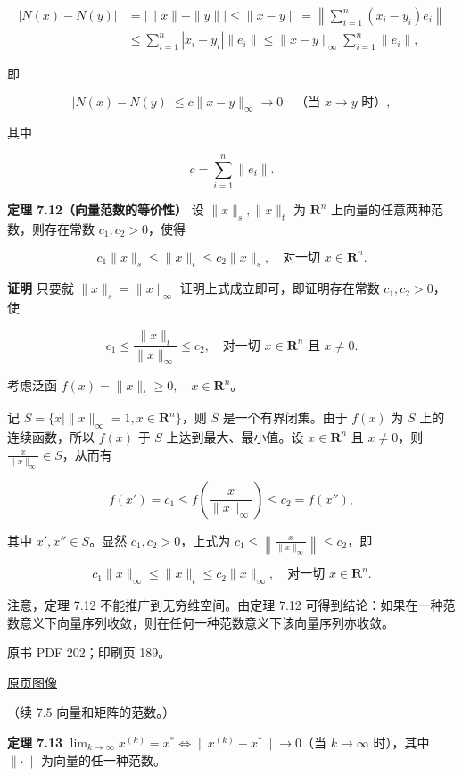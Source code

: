 \documentclass[
  10pt,
  fontset=fandol]{ctexart}
\begin{document}
\[
\begin{aligned}
|N(x)-N(y)|
&=\big|\|x\|-\|y\|\big|\leqslant\|x-y\|
=\left\|\sum_{i=1}^{n}(x_i-y_i)e_i\right\|\\
&\leqslant\sum_{i=1}^{n}|x_i-y_i|\|e_i\|
\leqslant\|x-y\|_\infty\sum_{i=1}^{n}\|e_i\|,
\end{aligned}
\]

即

\[
|N(x)-N(y)|\leqslant c\|x-y\|_\infty\to0\quad\text{（当 }x\to y\text{ 时）},
\]

其中

\[
c=\sum_{i=1}^{n}\|e_i\|.
\]

\textbf{定理 7.12（向量范数的等价性）} 设 \(\|x\|_s,\|x\|_t\) 为
\(\mathbf R^n\) 上向量的任意两种范数，则存在常数 \(c_1,c_2>0\)，使得

\[
c_1\|x\|_s\leqslant\|x\|_t\leqslant c_2\|x\|_s,\quad\text{对一切 }x\in\mathbf R^n.
\]

\textbf{证明} 只要就 \(\|x\|_s=\|x\|_\infty\)
证明上式成立即可，即证明存在常数 \(c_1,c_2>0\)，使

\[
c_1\leqslant\frac{\|x\|_t}{\|x\|_\infty}\leqslant c_2,\quad\text{对一切 }x\in\mathbf R^n\text{ 且 }x\neq0.
\]

考虑泛函 \(f(x)=\|x\|_t\geqslant0,\quad x\in\mathbf R^n\)。

记 \(S=\{x\mid\|x\|_\infty=1,x\in\mathbf R^n\}\)，则 \(S\)
是一个有界闭集。由于 \(f(x)\) 为 \(S\) 上的连续函数，所以 \(f(x)\) 于
\(S\) 上达到最大、最小值。设 \(x\in\mathbf R^n\) 且 \(x\neq0\)，则
\(\frac{x}{\|x\|_\infty}\in S\)，从而有

\[
f(x')=c_1\leqslant f\left(\frac{x}{\|x\|_\infty}\right)\leqslant c_2=f(x''),
\tag{7.5.3}
\]

其中 \(x',x''\in S\)。显然 \(c_1,c_2>0\)，上式为
\(c_1\leqslant\left\|\frac{x}{\|x\|_\infty}\right\|\leqslant c_2\)，即

\[
c_1\|x\|_\infty\leqslant\|x\|_t\leqslant c_2\|x\|_\infty,\quad\text{对一切 }x\in\mathbf R^n.
\]

注意，定理 7.12 不能推广到无穷维空间。由定理 7.12
可得到结论：如果在一种范数意义下向量序列收敛，则在任何一种范数意义下该向量序列亦收敛。

\clearpage

原书 PDF 202；印刷页 189。

\href{/Users/xiangjunfeng/Desktop/数值计算专用/numerical-analysis/book/source-images/pdf-202.jpeg}{原页图像}

（续 7.5 向量和矩阵的范数。）

\textbf{定理 7.13}
\(\lim_{k\to\infty}x^{(k)}=x^*\Longleftrightarrow\|x^{(k)}-x^*\|\to0\)（当
\(k\to\infty\) 时），其中 \(\|\cdot\|\) 为向量的任一种范数。
\end{document}
